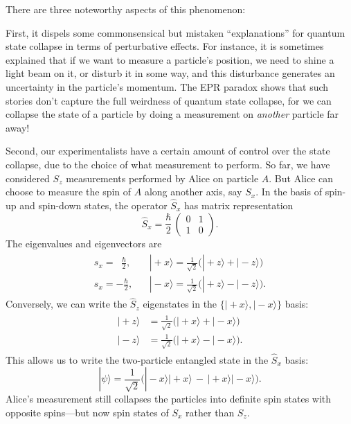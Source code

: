 \documentclass[pra,12pt]{revtex4}
\begin{document}
There are three noteworthy aspects of this phenomenon:

First, it dispels some commonsensical but mistaken ``explanations''
for quantum state collapse in terms of perturbative effects.  For
instance, it is sometimes explained that if we want to measure a
particle's position, we need to shine a light beam on it, or disturb
it in some way, and this disturbance generates an uncertainty in the
particle's momentum.  The EPR paradox shows that such stories don't
capture the full weirdness of quantum state collapse, for we can
collapse the state of a particle by doing a measurement on
\textit{another} particle far away!

Second, our experimentalists have a certain amount of control over the
state collapse, due to the choice of what measurement to perform.  So
far, we have considered $S_z$ measurements performed by Alice on
particle $A$.  But Alice can choose to measure the spin of $A$ along
another axis, say $S_x$.  In the basis of spin-up and spin-down
states, the operator $\hat{S}_x$ has matrix representation
\begin{equation}
  \hat{S}_x = \frac{\hbar}{2}\, \begin{pmatrix}0&1\\1&0\end{pmatrix}.
  \end{equation}
The eigenvalues and eigenvectors are
\begin{align}
  \begin{aligned}s_x = \;\;\frac{\hbar}{2},\; &\;\;\; |\!+\!x\rangle = \frac{1}{\sqrt{2}}\Big(|\!+\!z\rangle + |\!-\!z\rangle\Big) \\ s_x = -\frac{\hbar}{2}, &\;\;\; |\!-\!x\rangle = \frac{1}{\sqrt{2}}\Big(|\!+\!z\rangle - |\!-\!z\rangle\Big).\end{aligned}
\end{align}
Conversely, we can write the $\hat{S}_z$ eigenstates in the $\{|\!+\!x\rangle,|\!-\!x\rangle\}$ basis:
\begin{align}
  \begin{aligned}|\!+\!z\rangle &= \frac{1}{\sqrt{2}}\Big(|\!+\!x\rangle + |\!-\!x\rangle\Big) \\ |\!-\!z\rangle &= \frac{1}{\sqrt{2}}\Big(|\!+\!x\rangle - |\!-\!x\rangle\Big).\end{aligned}
\end{align}
This allows us to write the two-particle entangled state in the
$\hat{S}_x$ basis:
\begin{equation}
  |\psi\rangle = \frac{1}{\sqrt{2}} \Big(|\!-\!x\rangle|\!+\!x\rangle \,-\, |\!+\!x\rangle|\!-\!x\rangle\Big).
\end{equation}
Alice's measurement still collapses the particles into definite spin
states with opposite spins---but now spin states of ${S}_x$ rather
than ${S}_z$.
\end{document}
